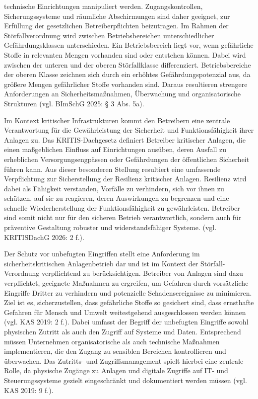 \documentclass[
  12pt,
  a4paper,
  oneside,
  headings=normal,
  numbers=noendperiod
]{scrreprt}
\numberwithin{equation}{chapter}
\begin{document}
\clearpage

\label{test:pure-prose}
technische Einrichtungen manipuliert werden. Zugangskontrollen,
Sicherungssysteme und räumliche Abschirmungen sind daher geeignet, zur Erfüllung
der gesetzlichen Betreiberpflichten beizutragen. Im Rahmen der
Störfallverordnung wird zwischen Betriebsbereichen unterschiedlicher
Gefährdungsklassen unterschieden. Ein Betriebsbereich liegt vor, wenn
gefährliche Stoffe in relevanten Mengen vorhanden sind oder entstehen können.
Dabei wird zwischen der unteren und der oberen Störfallklasse differenziert.
Betriebsbereiche der oberen Klasse zeichnen sich durch ein erhöhtes
Gefährdungspotenzial aus, da größere Mengen gefährlicher Stoffe vorhanden sind.
Daraus resultieren strengere Anforderungen an Sicherheitsmaßnahmen, Überwachung
und organisatorische Strukturen (vgl. BImSchG 2025: § 3 Abs. 5a).

Im Kontext kritischer Infrastrukturen kommt den Betreibern eine zentrale
Verantwortung für die Gewährleistung der Sicherheit und Funktionsfähigkeit ihrer
Anlagen zu. Das KRITIS-Dachgesetz definiert Betreiber kritischer Anlagen, die
einen maßgeblichen Einfluss auf Einrichtungen ausüben, deren Ausfall zu
erheblichen Versorgungsengpässen oder Gefährdungen der öffentlichen Sicherheit
führen kann. Aus dieser besonderen Stellung resultiert eine umfassende
Verpflichtung zur Sicherstellung der Resilienz kritischer Anlagen. Resilienz wird
dabei als Fähigkeit verstanden, Vorfälle zu verhindern, sich vor ihnen zu
schützen, auf sie zu reagieren, deren Auswirkungen zu begrenzen und eine
schnelle Wiederherstellung der Funktionsfähigkeit zu gewährleisten. Betreiber
sind somit nicht nur für den sicheren Betrieb verantwortlich, sondern auch für
präventive Gestaltung robuster und widerstandsfähiger Systeme. (vgl.
KRITISDachG 2026: 2 f.).

Der Schutz vor unbefugten Eingriffen stellt eine Anforderung im
sicherheitskritischen Anlagenbetrieb dar und ist im Kontext der
Störfall-Verordnung verpflichtend zu berücksichtigen. Betreiber von Anlagen
sind dazu verpflichtet, geeignete Maßnahmen zu ergreifen, um Gefahren durch
vorsätzliche Eingriffe Dritter zu verhindern und potenzielle Schadensereignisse
zu minimieren. Ziel ist es, sicherzustellen, dass gefährliche Stoffe so
gesichert sind, dass ernsthafte Gefahren für Mensch und Umwelt weitestgehend
ausgeschlossen werden können (vgl. KAS 2019: 2 f.). Dabei umfasst der Begriff
der unbefugten Eingriffe sowohl physischen Zutritt als auch den Zugriff auf
Systeme und Daten. Entsprechend müssen Unternehmen organisatorische als auch
technische Maßnahmen implementieren, die den Zugang zu sensiblen Bereichen
kontrollieren und überwachen. Das Zutritts- und Zugriffsmanagement spielt
hierbei eine zentrale Rolle, da physische Zugänge zu Anlagen und digitale
Zugriffe auf IT- und Steuerungssysteme gezielt eingeschränkt und dokumentiert
werden müssen (vgl. KAS 2019: 9 f.).
\end{document}
